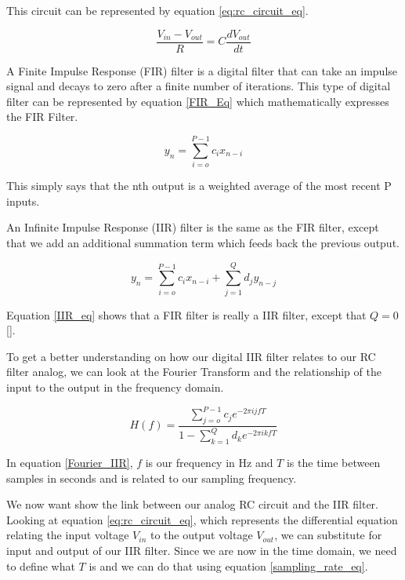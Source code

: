 This circuit can be represented by equation \ref{eq:rc_circuit_eq}.

\begin{equation}\label{eq:rc_circuit_eq}
\frac{V_{in}-V_{out}}{R}=C\frac{dV_{out}}{dt}
\end{equation}

A Finite Impulse Response (FIR) filter is a digital filter that can take an impulse signal and decays to zero after a finite number of iterations.  This type of digital filter can be represented by equation \ref{FIR_Eq} which mathematically expresses the FIR Filter.

\begin{equation}\label{FIR_Eq}
y_n=\displaystyle\sum\limits_{i=o}^{P-1} c_ix_{n-i}
\end{equation}

This simply says that the nth output is a weighted average of the most recent P inputs.  

An Infinite Impulse Response (IIR) filter is the same as the FIR filter, except that we add an additional summation term which feeds back the previous output.

\begin{equation}\label{IIR_eq}
y_n=\displaystyle\sum\limits_{i=o}^{P-1} c_ix_{n-i}+\displaystyle\sum\limits_{j=1}^{Q} d_jy_{n-j}
\end{equation}

Equation \ref{IIR_eq} shows that a FIR filter is really a IIR filter, except that $Q=0$[\cite{Cross}].  

To get a better understanding on how our digital IIR filter relates to our RC filter analog, we can look at the Fourier Transform and the relationship of the input to the output in the frequency domain.

\begin{equation}\label{Fourier_IIR}
H(f)=\frac{\displaystyle\sum\limits_{j=o}^{P-1} c_je^{-2\pi ijfT}}{1-\displaystyle\sum\limits_{k=1}^{Q} d_ke^{-2\pi ikfT}}
\end{equation}

In equation \ref{Fourier_IIR}, $f$ is our frequency in Hz and $T$ is the time between samples in seconds and is related to our sampling frequency.

We now want show the link between our analog RC circuit and the IIR filter.  Looking at equation \ref{eq:rc_circuit_eq}, which represents the differential equation relating the input voltage $V_{in}$ to the output voltage $V_{out}$, we can substitute for input and output of our IIR filter.  Since we are now in the time domain, we need to define what $T$ is and we can do that using equation \ref{sampling_rate_eq}.

